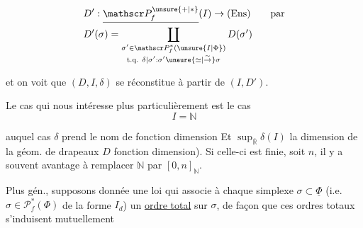 \[
\begin{aligned}
 &D':\underline{\mathscr P_f^{\unsure{+|*}}}(I)\to(\mathrm{Ens})\qquad\text{par}\\
 &D'(\sigma)=\coprod_{\substack{\sigma'\in\mathscr P_f^*(\unsure{I|\Phi})\\\text{t.q. }\delta|\sigma':\sigma'\unsure{\simeq|\overset{\sim}{\to}}\sigma}}D(\sigma')
\end{aligned}
\]

et on voit que $(D,I,\delta)$ se réconstitue à partir de $(I,D')$. 




Le cas qui nous intéresse plus particulièrement est le cas
\[
 I=\mathbb N
\]

auquel cas $\delta$ prend le nom de fonction dimension  Et $\sup_{\overline{\mathbb R}}\delta(I)$  la dimension de la géom. de drapeaux $D$  fonction dimension). Si celle-ci est finie, soit $n$, il y a souvent avantage à remplacer $\mathbb N$ par $[0,n]_{\mathbb N}$.

Plus gén.,  supposons donnée une loi qui associe à chaque  simplexe $\sigma\subset\underline{\Phi}$ (i.e. $\sigma\in\mathscr P_f^*(\Phi)$ de la forme $I_d$) un \uline{ordre total} sur $\sigma$, de façon que ces ordres totaux s'induisent mutuellement

